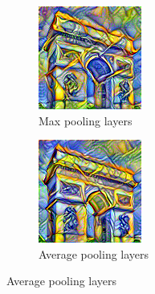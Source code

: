 \documentclass[12pt]{beamer}
\begin{document}
    \begin{frame}
        \begin{figure}[H]
            \centering
            \begin{subfigure}[b]{0.45\textwidth}
                \centering
                \includegraphics[width=\textwidth]{resources/gatys/architecture/sun-trees-paris-maxpool.png}
                \caption{Max pooling layers}
            \end{subfigure}
            \hfill
            \begin{subfigure}[b]{0.45\textwidth}
                \centering
                \includegraphics[width=\textwidth]{resources/gatys/architecture/sun-trees-paris-avgpool.png}
                \caption{Average pooling layers}
            \end{subfigure}
        \end{figure}


\end{frame}
\end{document}
